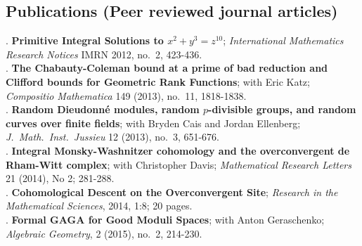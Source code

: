 \documentclass[margin,line]{res}
\newcounter{pubs}
\begin{document}
\begin{resume}





\section{\sc Publications (Peer reviewed journal articles)}
 . \textbf{Primitive Integral Solutions to $x^2 + y^3 = z^{10}$}; \emph{International Mathematics Research Notices} IMRN 2012, no.~2, 423-436. \vspace{.08cm}\\
 . \textbf{The Chabauty-Coleman bound at a prime of bad reduction and Clifford bounds for Geometric Rank Functions}; with Eric Katz; \emph{Compositio Mathematica} 149 (2013), no.~11, 1818-1838. \vspace{.08cm}\\
 . \textbf{Random Dieudonn\'e modules, random $p$-divisible groups, and   random curves over finite fields}; with Bryden Cais and Jordan Ellenberg; \emph{J.~Math.~Inst.~Jussieu} 12 (2013), no.~3, 651-676. \vspace{.08cm}\\
 . \textbf{Integral Monsky-Washnitzer cohomology and the overconvergent de Rham-Witt complex}; with Christopher Davis; \emph{Mathematical Research Letters} 21 (2014), No 2; 281-288. \vspace{.08cm}\\
 . \textbf{Cohomological Descent on the Overconvergent Site}; \emph{Research in the Mathematical Sciences}, 2014, 1:8; 20 pages.\vspace{.08cm}\\
 . \textbf{Formal GAGA for Good Moduli Spaces}; with Anton Geraschenko; \emph{Algebraic Geometry}, 2 (2015), no.~2, 214-230. \vspace{.08cm}\\

\end{resume}
\end{document}
